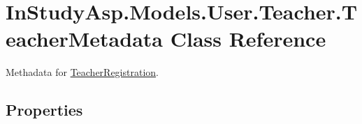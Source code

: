 \hypertarget{class_in_study_asp_1_1_models_1_1_user_1_1_teacher_1_1_teacher_metadata}{}\section{In\+Study\+Asp.\+Models.\+User.\+Teacher.\+Teacher\+Metadata Class Reference}
\label{class_in_study_asp_1_1_models_1_1_user_1_1_teacher_1_1_teacher_metadata}


Methadata for \hyperlink{class_in_study_asp_1_1_models_1_1_user_1_1_teacher_1_1_teacher_registration}{Teacher\+Registration}.  


\subsection*{Properties}
